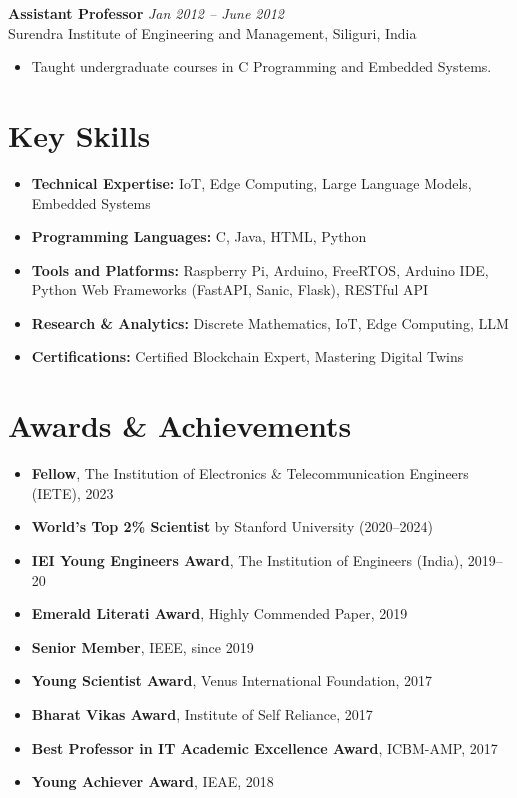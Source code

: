 \documentclass[10pt,a4paper]{article}
\begin{document}
	\textbf{Assistant Professor} \hfill \textit{Jan 2012 -- June 2012}\\
	Surendra Institute of Engineering and Management, Siliguri, India
	\begin{itemize}[leftmargin=0.2in]
		\item Taught undergraduate courses in C Programming and Embedded Systems.
	\end{itemize}
	
	\section*{Key Skills}
	
	\begin{itemize}[leftmargin=0.15in]
		\item \textbf{Technical Expertise:} IoT, Edge Computing, Large Language Models, Embedded Systems
		\item \textbf{Programming Languages:} C, Java, HTML, Python
		\item \textbf{Tools and Platforms:} Raspberry Pi, Arduino, FreeRTOS, Arduino IDE, Python Web Frameworks (FastAPI, Sanic, Flask), RESTful API 
		\item \textbf{Research \& Analytics:} Discrete Mathematics, IoT, Edge Computing, LLM
		\item \textbf{Certifications:} Certified Blockchain Expert, Mastering Digital Twins
	\end{itemize}
	
	\section*{Awards \& Achievements}
	
	\begin{itemize}[leftmargin=0.15in]
		\item \textbf{Fellow}, The Institution of Electronics \& Telecommunication Engineers (IETE), 2023
		\item \textbf{World's Top 2\% Scientist} by Stanford University (2020--2024)
		\item \textbf{IEI Young Engineers Award}, The Institution of Engineers (India), 2019--20
		\item \textbf{Emerald Literati Award}, Highly Commended Paper, 2019
		\item \textbf{Senior Member}, IEEE, since 2019
		\item \textbf{Young Scientist Award}, Venus International Foundation, 2017
		\item \textbf{Bharat Vikas Award}, Institute of Self Reliance, 2017
		\item \textbf{Best Professor in IT Academic Excellence Award}, ICBM-AMP, 2017
		\item \textbf{Young Achiever Award}, IEAE, 2018
	\end{itemize}
	
\end{document}

